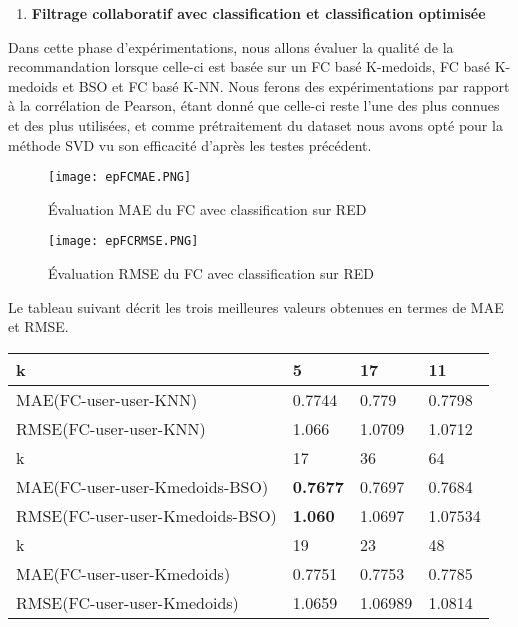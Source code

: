 \begin{enumerate}[nosep,label=\textbf{\arabic*)}]
	\item \textbf{Filtrage collaboratif avec classification et classification optimisée}
\end{enumerate}\mbox{}\indent{} Dans cette phase d’expérimentations, nous allons évaluer la qualité de la recommandation lorsque celle-ci est basée sur un FC basé K-medoids, FC basé K-medoids et BSO et FC basé K-NN. Nous ferons des expérimentations par rapport à la corrélation de Pearson, étant donné que celle-ci reste l’une des plus connues et des plus utilisées, et comme prétraitement du dataset nous avons opté pour la méthode SVD vu son efficacité d'après les testes précédent.
\begin{figure}[H]
	\centering
	\texttt{[image: epFCMAE.PNG]}
	\caption{Évaluation MAE du FC avec classification sur RED}
	\label{fig:epFCMAE}
\end{figure}

\begin{figure}[H]
	\centering
	\texttt{[image: epFCRMSE.PNG]}
	\caption{Évaluation RMSE du FC avec classification sur RED}
	\label{fig:epFCRMSE}
\end{figure}
Le tableau suivant décrit les trois meilleures valeurs obtenues en termes de MAE et RMSE.
\begin{table}[H]
	\centering
	\begin{tabular}{|l|l|l|l|}
		\hline
		k & 5 & 17 & 11 \\ \hline
		MAE(FC-user-user-KNN) & 0.7744 & 0.779 & 0.7798 \\ \hline
		RMSE(FC-user-user-KNN) & 1.066& 1.0709 & 1.0712 \\ \hline\hline
		k & 17 & 36 & 64 \\ \hline
		MAE(FC-user-user-Kmedoids-BSO) & \textbf{0.7677} & 0.7697  & 0.7684 \\ \hline
		RMSE(FC-user-user-Kmedoids-BSO) &\textbf{1.060} & 1.0697  & 1.07534 \\ \hline\hline
		k & 19 & 23 & 48 \\ \hline
		MAE(FC-user-user-Kmedoids) & 0.7751& 0.7753 & 0.7785\\ \hline
		RMSE(FC-user-user-Kmedoids) & 1.0659 & 1.06989 & 1.0814 \\ \hline
	\end{tabular}
\end{table}
